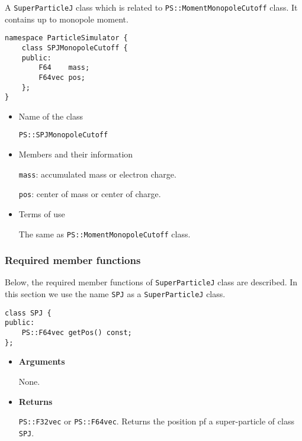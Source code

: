 
\label{sec:SPJMonopoleCutoff}

A \texttt{SuperParticleJ} class which is related to \texttt{PS::MomentMonopoleCutoff} class. It contains up to monopole moment.

\begin{screen}
\begin{verbatim}
namespace ParticleSimulator {
    class SPJMonopoleCutoff {
    public:
        F64    mass;
        F64vec pos;
    };
}
\end{verbatim}
\end{screen}

\begin{itemize}

\item Name of the class

  \texttt{PS::SPJMonopoleCutoff}

\item Members and their information

  \texttt{mass}: accumulated mass or electron charge.

  \texttt{pos}: center of mass or center of charge.

\item Terms of use

  The same as \texttt{PS::MomentMonopoleCutoff} class.

\end{itemize}

\subsubsection{Required member functions}


Below, the required member functions of \texttt{SuperParticleJ} class are described. In this section we use the name \texttt{SPJ} as a \texttt{SuperParticleJ} class.


\begin{screen}
\begin{verbatim}
class SPJ {
public:
    PS::F64vec getPos() const;
};
\end{verbatim}
\end{screen}

\begin{itemize}

\item {\bf Arguments}

  None.
  
\item {\bf Returns}

  \texttt{PS::F32vec} or \texttt{PS::F64vec}.
  Returns the position pf a super-particle of class \texttt{SPJ}.
  
\end{itemize}

